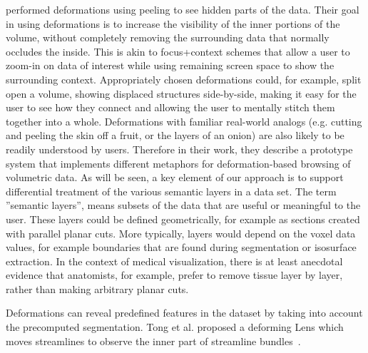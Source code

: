   
  \cite{1250400} performed deformations using peeling to see hidden parts of the data. Their goal in using deformations is to increase the visibility of
the inner portions of the volume, without completely removing the
surrounding data that normally occludes the inside. This is akin to
focus+context schemes that allow a user to zoom-in on data of
interest while using remaining screen space to show the surrounding
context. Appropriately chosen deformations could, for example,
split open a volume, showing displaced structures side-by-side,
making it easy for the user to see how they connect and allowing
the user to mentally stitch them together into a whole. Deformations
with familiar real-world analogs (e.g. cutting and peeling the skin off a fruit, or the layers of an onion) are also likely to be
readily understood by users.
Therefore in their work, they describe a prototype system that implements
different metaphors for deformation-based browsing of volumetric
data. 
As will be seen, a key element of our approach is to support
differential treatment of the various semantic layers in a data set.
The term ''semantic layers'', means subsets of the data that are useful
or meaningful to the user. These layers could be defined geometrically,
for example as sections created with parallel planar cuts.
More typically, layers would depend on the voxel data values, for
example boundaries that are found during segmentation or isosurface
extraction. In the context of medical visualization, there is at
least anecdotal evidence that anatomists, for example, prefer to remove
tissue layer by layer, rather than making
arbitrary planar cuts.
 
 
Deformations can reveal predefined features in the dataset by taking into account the precomputed segmentation. Tong et al. proposed a deforming Lens which moves streamlines to observe the inner part of streamline bundles~\cite{7332955}. 

